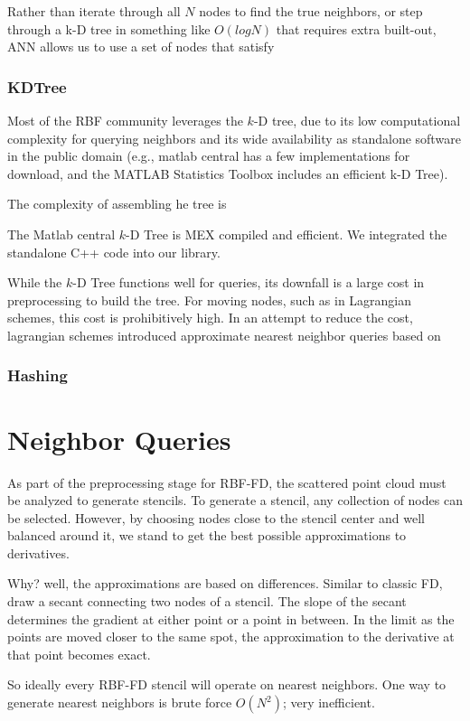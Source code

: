 \documentclass{report}
\begin{document}
Rather than iterate through all $N$ nodes to find the true neighbors, or step through a k-D tree in something like $O(log N)$ that requires extra built-out, ANN allows us to use a set of nodes that satisfy


\subsubsection{KDTree}
Most of the RBF community leverages the $k$-D tree, due to its low computational complexity for querying neighbors and its wide availability as standalone software in the public domain (e.g., matlab central has a few implementations for download, and the MATLAB Statistics Toolbox includes an efficient k-D Tree). 

The complexity of assembling he tree is

The Matlab central $k$-D Tree is MEX compiled and efficient. We integrated the standalone C++ code into our library.  

While the $k$-D Tree functions well for queries, its downfall is a large cost in preprocessing to build the tree. For moving nodes, such as in Lagrangian schemes, this cost is prohibitively high. In an attempt to reduce the cost, lagrangian schemes introduced approximate nearest neighbor queries based on 


\subsubsection{Hashing}

\section{Neighbor Queries} 

As part of the preprocessing stage for RBF-FD, the scattered point cloud must
be analyzed to generate stencils. To generate a stencil, any collection of
nodes can be selected. However, by choosing nodes close to the stencil center
and well balanced around it, we stand to get the best possible approximations
to derivatives. 

Why? well, the approximations are based on differences. Similar to classic FD,
draw a secant connecting two nodes of a stencil. The slope of the secant
determines the gradient at either point or a point in between. In the limit as
the points are moved closer to the same spot, the approximation to the
derivative at that point becomes exact. 

So ideally every RBF-FD stencil will operate on nearest neighbors. One way to
generate nearest neighbors is brute force $O(N^{2})$; very inefficient. 
\end{document}
